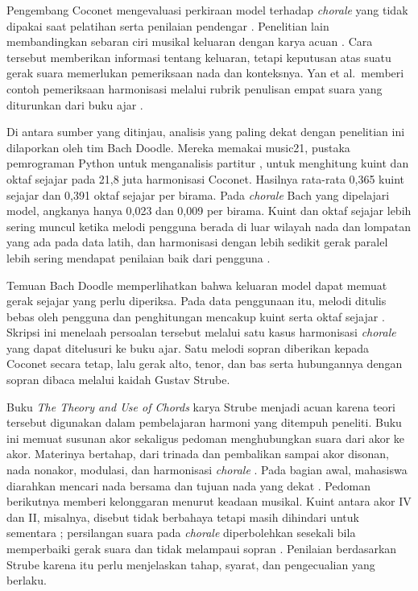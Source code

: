 Pengembang Coconet mengevaluasi perkiraan model terhadap \textit{chorale} yang tidak dipakai saat pelatihan serta penilaian pendengar \parencite[215--216]{huang2017}. Penelitian lain membandingkan sebaran ciri musikal keluaran dengan karya acuan \parencite{yang2020}. Cara tersebut memberikan informasi tentang keluaran, tetapi keputusan atas suatu gerak suara memerlukan pemeriksaan nada dan konteksnya. Yan et al.\ memberi contoh pemeriksaan harmonisasi melalui rubrik penulisan empat suara yang diturunkan dari buku ajar \parencite{yan2018}.

Di antara sumber yang ditinjau, analisis yang paling dekat dengan penelitian ini dilaporkan oleh tim Bach Doodle. Mereka memakai music21, pustaka pemrograman Python untuk menganalisis partitur \parencite{cuthbert2010}, untuk menghitung kuint dan oktaf sejajar pada 21,8 juta harmonisasi Coconet. Hasilnya rata-rata 0,365 kuint sejajar dan 0,391 oktaf sejajar per birama. Pada \textit{chorale} Bach yang dipelajari model, angkanya hanya 0,023 dan 0,009 per birama. Kuint dan oktaf sejajar lebih sering muncul ketika melodi pengguna berada di luar wilayah nada dan lompatan yang ada pada data latih, dan harmonisasi dengan lebih sedikit gerak paralel lebih sering mendapat penilaian baik dari pengguna \parencite[798]{huang2019}.

Temuan Bach Doodle memperlihatkan bahwa keluaran model dapat memuat gerak sejajar yang perlu diperiksa. Pada data penggunaan itu, melodi ditulis bebas oleh pengguna dan penghitungan mencakup kuint serta oktaf sejajar \parencite[798]{huang2019}. Skripsi ini menelaah persoalan tersebut melalui satu kasus harmonisasi \textit{chorale} yang dapat ditelusuri ke buku ajar. Satu melodi sopran diberikan kepada Coconet secara tetap, lalu gerak alto, tenor, dan bas serta hubungannya dengan sopran dibaca melalui kaidah Gustav Strube.

Buku \textit{The Theory and Use of Chords} karya Strube menjadi acuan karena teori tersebut digunakan dalam pembelajaran harmoni yang ditempuh peneliti. Buku ini memuat susunan akor sekaligus pedoman menghubungkan suara dari akor ke akor. Materinya bertahap, dari trinada dan pembalikan sampai akor disonan, nada nonakor, modulasi, dan harmonisasi \textit{chorale} \parencite{strube1928}. Pada bagian awal, mahasiswa diarahkan mencari nada bersama dan tujuan nada yang dekat \parencite[7]{strube1928}. Pedoman berikutnya memberi kelonggaran menurut keadaan musikal. Kuint antara akor IV dan II, misalnya, disebut tidak berbahaya tetapi masih dihindari untuk sementara \parencite[45]{strube1928}; persilangan suara pada \textit{chorale} diperbolehkan sesekali bila memperbaiki gerak suara dan tidak melampaui sopran \parencite[174]{strube1928}. Penilaian berdasarkan Strube karena itu perlu menjelaskan tahap, syarat, dan pengecualian yang berlaku.

